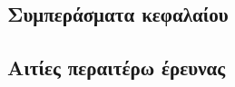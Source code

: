 \subsection{Συμπεράσματα κεφαλαίου}
\label{subsection:02_03_05:01}

\subsection{Αιτίες περαιτέρω έρευνας}
\label{subsection:02_03_05:02}
